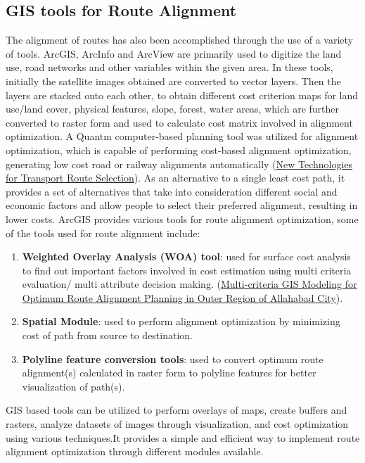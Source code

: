 \subsection{GIS tools for Route Alignment}
The alignment of routes has also been accomplished through the use of a variety of tools. ArcGIS, ArcInfo and ArcView are primarily used to digitize the land use, road networks and other variables within the given area. In these tools, initially the satellite images obtained are converted to vector layers. Then the layers are stacked onto each other, to obtain different cost criterion maps for land use/land cover, physical features, slope, forest, water areas, which are further converted to raster form and used to calculate cost matrix involved in alignment optimization. A Quantm computer-based planning tool was utilized for alignment optimization, which is capable of performing cost-based alignment optimization, generating low cost road or railway alignments automatically (\href{https://doi.org/10.1016/S0968-090X(00)00040-1}{New Technologies for Transport Route Selection}). As an alternative to a single least cost path, it provides a set of alternatives that take into consideration different social and economic factors and allow people to select their preferred alignment, resulting in lower costs. 
ArcGIS provides various tools for route alignment optimization, some of the tools used for route alignment include:
\begin{enumerate}
\item \textbf{Weighted Overlay Analysis (WOA) tool}: used for surface cost analysis to find out important factors involved in cost estimation using multi criteria evaluation/ multi attribute decision making. (\href{https://link.springer.com/article/10.1007/s12517-017-3076-z}{Multi-criteria GIS Modeling for Optimum Route Alignment Planning in Outer Region of Allahabad City}).
\item \textbf{Spatial Module}: used to perform alignment optimization by minimizing cost of path from source to destination.
\item \textbf{Polyline feature conversion tools}: used to convert optimum route alignment(s) calculated in raster form to polyline features for better visualization of path(s).
\end{enumerate}
GIS based tools can be utilized to perform overlays of maps, create buffers and rasters, analyze datasets of images through visualization, and cost optimization using various techniques.It provides a simple and efficient way to implement route alignment optimization through different modules available.



